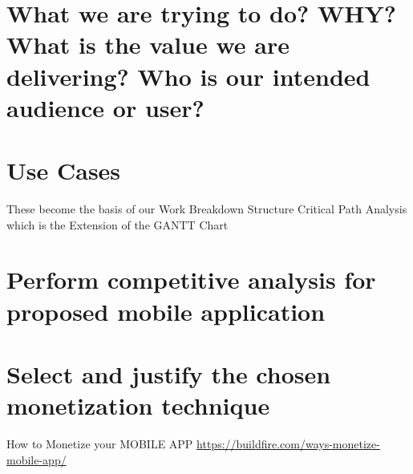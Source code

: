 \section{What we are trying to do? WHY? What is the value we are delivering?  Who is our intended audience or user?}

\section{Use Cases}
  These become the basis of our Work Breakdown Structure
    Critical Path Analysis which is the Extension of the GANTT Chart



\section{Perform competitive analysis for proposed mobile application}

\section{Select and justify the chosen monetization technique}
  How to Monetize your MOBILE APP
  \url{https://buildfire.com/ways-monetize-mobile-app/}
  
